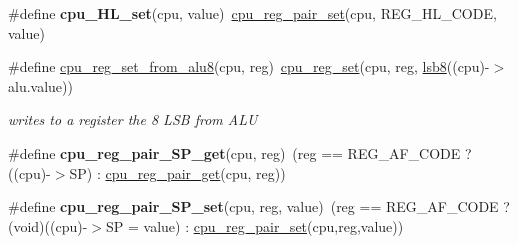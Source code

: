 \begin{DoxyCompactItemize}
\item 
\mbox{\label{cpu-registers_8h_accd9f248a886b30709b7edeee1e0bff5}} 
\#define {\bfseries cpu\+\_\+\+H\+L\+\_\+set}(cpu,  value)~\hyperlink{cpu-registers_8h_aa7482c91cfc29f6a4a1ba62127f6ea35}{cpu\+\_\+reg\+\_\+pair\+\_\+set}(cpu, R\+E\+G\+\_\+\+H\+L\+\_\+\+C\+O\+DE, value)
\item 
\#define \hyperlink{cpu-registers_8h_ada31ffcbbeebed96cc72f2d9bab0f6b0}{cpu\+\_\+reg\+\_\+set\+\_\+from\+\_\+alu8}(cpu,  reg)~\hyperlink{cpu-registers_8h_a422598e03e342ec1c700cd61a3bc69b6}{cpu\+\_\+reg\+\_\+set}(cpu, reg, \hyperlink{bit_8h_aa7214f9bc705f6d655fafa3a15f672e8}{lsb8}((cpu)-\/$>$alu.\+value))
\begin{DoxyCompactList}\small\item\em writes to a register the 8 L\+SB from A\+LU \end{DoxyCompactList}\item 
\mbox{\label{cpu-registers_8h_a843750750b64110582a8a9bc53adb873}} 
\#define {\bfseries cpu\+\_\+reg\+\_\+pair\+\_\+\+S\+P\+\_\+get}(cpu,  reg)~(reg == R\+E\+G\+\_\+\+A\+F\+\_\+\+C\+O\+DE ? ((cpu)-\/$>$SP) \+: \hyperlink{cpu-registers_8h_a259712cddf80a16395900832af372953}{cpu\+\_\+reg\+\_\+pair\+\_\+get}(cpu, reg))
\item 
\mbox{\label{cpu-registers_8h_ac7e75cf600f29bb9fdbbfa13800bb80a}} 
\#define {\bfseries cpu\+\_\+reg\+\_\+pair\+\_\+\+S\+P\+\_\+set}(cpu,  reg,  value)~(reg == R\+E\+G\+\_\+\+A\+F\+\_\+\+C\+O\+DE ? (void)((cpu)-\/$>$SP = value) \+: \hyperlink{cpu-registers_8h_aa7482c91cfc29f6a4a1ba62127f6ea35}{cpu\+\_\+reg\+\_\+pair\+\_\+set}(cpu,reg,value))
\end{DoxyCompactItemize}

